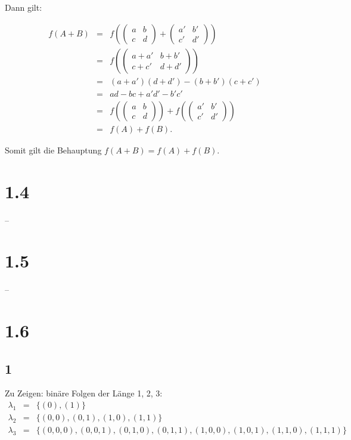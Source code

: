 \documentclass[12pt]{article}
\begin{document}
Dann gilt:

\begin{eqnarray*}
f(A+B) &=& f( \left(  
    \begin{array}{ll} a & b \\
     c & d   \end{array}\right)
     +
    \left( 
        \begin{array}{ll} 
        a' & b' \\
         c' & d'  
         \end{array} \right)     
     )\\
     &=& f(
    \left( 
        \begin{array}{ll} 
        a+a' & b+b' \\
         c+c' & d+d'  
         \end{array} \right)  
     ) \\
     &=& (a+a')(d+d')-(b+b')(c+c')\\
     &=&
     ad - bc + a'd' - b'c' \\
     &=&  f(
         \left(  
    \begin{array}{ll} a & b \\
     c & d   \end{array}\right) 
     ) + f(
             \left( 
        \begin{array}{ll} 
        a' & b' \\
         c' & d'  
         \end{array} \right)     
     ) \\
     &=& f(A)+f(B).
\end{eqnarray*}

Somit gilt die Behauptung $f(A+B) = f(A)+f(B).$

\section*{1.4}
--

\section*{1.5}
--
\newpage
\section*{1.6}
\subsection*{1}
Zu Zeigen: binäre Folgen der Länge 1, 2, 3:
\begin{eqnarray*}
\lambda_1 &=& \{(0), (1)\} \\
\lambda_2 &=& \{(0,0), (0,1), (1,0), (1,1)\} \\
\lambda_3 &=& \{(0,0,0),(0,0,1),(0,1,0),(0,1,1),(1,0,0),(1,0,1),(1,1,0),(1,1,1)\}
\end{eqnarray*}
\end{document}
